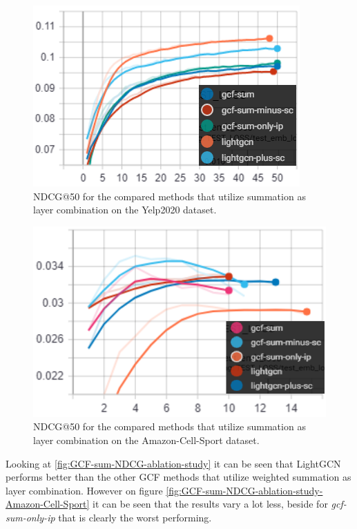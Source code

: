 \begin{figure}[h!]
    \includegraphics[width=\linewidth]{figures/gcf-sum-ndcg.png}
    \caption{NDCG@50 for the compared methods that utilize summation as layer combination on the Yelp2020 dataset.}
    \label{fig:GCF-sum-NDCG-ablation-study}
\end{figure}
\begin{figure}[h!]
    \includegraphics[width=\linewidth]{figures/amazon-cell-sport-gcf-sum-ndcg.png}
    \caption{NDCG@50 for the compared methods that utilize summation as layer combination on the Amazon-Cell-Sport dataset.}
    \label{fig:GCF-sum-NDCG-ablation-study-Amazon-Cell-Sport}
\end{figure}
Looking at \autoref{fig:GCF-sum-NDCG-ablation-study} it can be seen that LightGCN performs better than the other GCF methods that utilize weighted summation as layer combination.
However on figure \autoref{fig:GCF-sum-NDCG-ablation-study-Amazon-Cell-Sport} it can be seen that the results vary a lot less, beside for \textit{gcf-sum-only-ip} that is clearly the worst performing.

